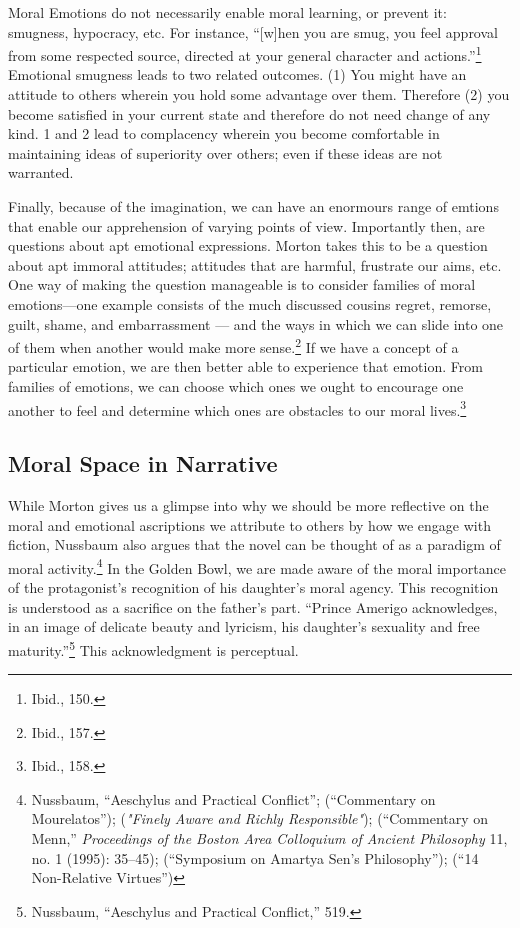 \documentclass[phdthesis,12pt,final,a4paper]{wuthesis}
\theoremstyle{definition}
\theoremstyle{definition}
\theoremstyle{definition}
\theoremstyle{definition}
\theoremstyle{remark}
\begin{document}
Moral Emotions do not necessarily enable moral learning, or prevent it: smugness, hypocracy, etc. For instance, ``{[}w{]}hen you are smug, you feel approval from some respected source, directed at your general character and actions.''\footnote{Ibid., 150.} Emotional smugness leads to two related outcomes. (1) You might have an attitude to others wherein you hold some advantage over them. Therefore (2) you become satisfied in your current state and therefore do not need change of any kind. 1 and 2 lead to complacency wherein you become comfortable in maintaining ideas of superiority over others; even if these ideas are not warranted.

Finally, because of the imagination, we can have an enormours range of emtions that enable our apprehension of varying points of view. Importantly then, are questions about apt emotional expressions. Morton takes this to be a question about apt immoral attitudes; attitudes that are harmful, frustrate our aims, etc. One way of making
the question manageable is to consider families of moral emotions---one example consists of the much discussed cousins regret, remorse, guilt, shame, and embarrassment --- and the ways in which we can slide into one of them when another would make more sense.\footnote{Ibid., 157.} If we have a concept of a particular emotion, we are then better able to experience that emotion. From families of emotions, we can choose which ones we ought to encourage one another to feel and determine which ones are obstacles to our moral lives.\footnote{Ibid., 158.}

\subsection*{Moral Space in Narrative}\label{moral-space-in-narrative}

While Morton gives us a glimpse into why we should be more reflective on the moral and emotional ascriptions we attribute to others by how we engage with fiction, Nussbaum also argues that the novel can be thought of as a paradigm of moral activity.\footnote{Nussbaum, {``Aeschylus and Practical Conflict''}; ({``Commentary on {Mourelatos}''}); (\emph{"{Finely Aware} and {Richly Responsible}"}); ({``Commentary on {Menn},''} \emph{Proceedings of the Boston Area Colloquium of Ancient Philosophy} 11, no. 1 (1995): 35--45); ({``Symposium on {Amartya Sen}'s Philosophy''}); ({``14 {Non-Relative Virtues}''})} In the Golden Bowl, we are made aware of the moral importance of the protagonist's recognition of his daughter's moral agency. This recognition is understood as a sacrifice on the father's part. ``Prince Amerigo acknowledges, in an image of delicate beauty and lyricism, his daughter's sexuality and free maturity.''\footnote{Nussbaum, {``Aeschylus and Practical Conflict,''} 519.} This acknowledgment is perceptual.
\end{document}

